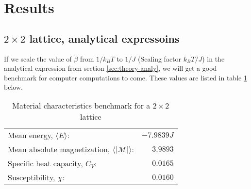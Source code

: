 \documentclass[../main.tex]{subfiles}
\begin{document}
\section{Results}
\subsection{$2 \times 2$ lattice, analytical expressoins}
If we scale the value of $\beta$ from $1/k_BT$ to $1/J$ (Scaling factor $k_B T/J$) in the analytical expression from section \ref{sec:theory-analy}, we will get a good benchmark for computer computations to come. These values are listed in table \ref{tab:2x2spinsEnergiesMags} below.
\begin{table}[!h]
\begin{center}
  \begin{tabular}{l r}
    Mean energy, $\langle E \rangle$: & $-7.9839J$  \\
    Mean absolute magnetization, $\langle |\mathcal{M}| \rangle$: & $3.9893$ \\
    Specific heat capacity, $C_V$: & $0.0165$\\
    Susceptibility, $\chi$: & $0.0160$
  \end{tabular}
  \caption{Material characteristics benchmark for a $2 \times 2$ lattice}
  \label{tab:2x2spinsEnergiesMags}
\end{center}
\end{table}
\FloatBarrier
\end{document}
